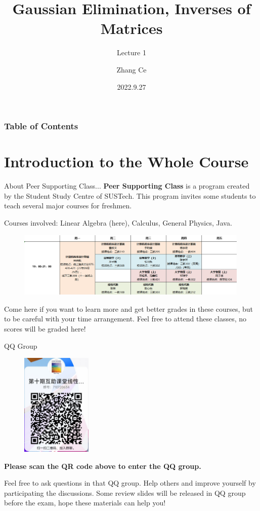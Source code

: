\documentclass{beamer}
\title[Linear Algebra] %
{Gaussian Elimination, Inverses of Matrices}
\subtitle{Lecture 1}
\author[zhangc2019@mail.sustech.edu.cn] %
{
    Zhang Ce
}
\institute[] %
{
    Department of Electrical and Electronic Engineering\\
    Southern University of Science and Technology
}
\date[2022.9.27] %
{2022.9.27}
\begin{document}
\frame{\titlepage}


\begin{frame}
\frametitle{Table of Contents}
\tableofcontents
\end{frame}

\section{Introduction to the Whole Course}

\begin{frame}{About Peer Supporting Class...}
\textbf{Peer Supporting Class} is a program created by the Student Study Centre of SUSTech. This program invites some students to teach several major courses for freshmen.

Courses involved: Linear Algebra (here), Calculus, General Physics, Java.

\begin{figure}
    \centering
    \includegraphics[width=0.99\textwidth]{arrangement.png}
\end{figure}

Come here if you want to learn more and get better grades in these courses, but to be careful with your time arrangement. Feel free to attend these classes, no scores will be graded here!

\end{frame}

\begin{frame}{QQ Group}
\begin{figure}
    \centering
    \includegraphics[width=0.3\textwidth]{QR.png}
\end{figure}
\textbf{Please scan the QR code above to enter the QQ group.}

Feel free to ask questions in that QQ group. Help others and improve yourself by participating the discussions. Some review slides will be released in QQ group before the exam, hope these materials can help you!

\end{frame}
\end{document}
